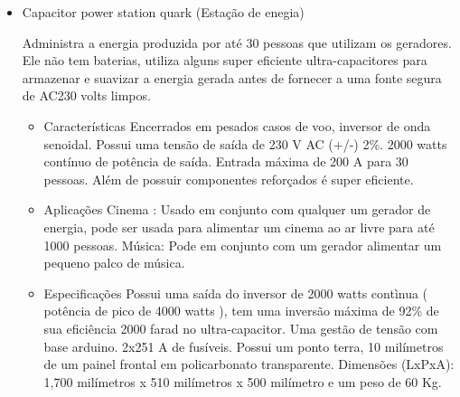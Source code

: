 \begin{itemize}
	\item Capacitor power station quark (Estação de enegia)
	
	Administra a energia produzida por até 30 pessoas que utilizam os geradores. Ele não tem baterias, utiliza alguns super eficiente ultra-capacitores para armazenar e suavizar a energia gerada antes de fornecer a uma fonte segura de AC230 volts limpos.
	\begin{itemize}
		\item Características
		Encerrados em pesados casos de voo, inversor de onda senoidal. Possui uma tensão de saída de 230 V AC (+/-) 2\%. 2000 watts contínuo de potência de saída. Entrada máxima de 200 A para 30 pessoas. Além de possuir componentes reforçados é super eficiente.
	\end{itemize}
	
	\begin{itemize}
		\item Aplicações
		Cinema : Usado em conjunto com qualquer um gerador de energia, pode ser usada para alimentar um cinema ao ar livre para até 1000 pessoas.
Música: Pode em conjunto com um gerador alimentar um pequeno palco de música.
	\end{itemize}
	
	\begin{itemize}
		\item Especificações
		Possui uma saída do inversor de 2000 watts contìnua ( potência de pico de 4000 watts ), tem uma inversão máxima de 92\% de sua eficiência 2000 farad no ultra-capacitor. Uma gestão de tensão com base arduino. 2x251 A de fusíveis. Possui um ponto terra, 10 milímetros de um painel frontal em policarbonato transparente. Dimensões (LxPxA): 1,700 milímetros x 510 milímetros x 500 milímetro e um peso de 60 Kg.
	\end{itemize}
	

\end{itemize}
